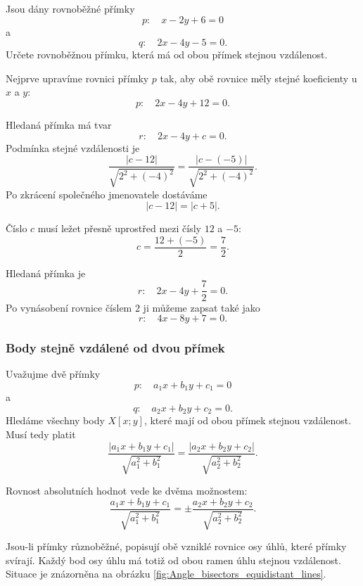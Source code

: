 \begin{example}\label{exa:Midline_parallel_strip}
    Jsou dány rovnoběžné přímky
    \[
        p:\quad x-2y+6=0
    \]
    a
    \[
        q:\quad 2x-4y-5=0.
    \]
    Určete rovnoběžnou přímku, která má od obou přímek stejnou
    vzdálenost.

    Nejprve upravíme rovnici přímky $p$ tak, aby obě rovnice měly
    stejné koeficienty u $x$ a $y$:
    \[
        p:\quad 2x-4y+12=0.
    \]

    Hledaná přímka má tvar
    \[
        r:\quad 2x-4y+c=0.
    \]
    Podmínka stejné vzdálenosti je
    \[
        \frac{|c-12|}{\sqrt{2^2+(-4)^2}}
        =
        \frac{|c-(-5)|}{\sqrt{2^2+(-4)^2}}.
    \]
    Po zkrácení společného jmenovatele dostáváme
    \[
        |c-12|=|c+5|.
    \]

    Číslo $c$ musí ležet přesně uprostřed mezi čísly $12$ a $-5$:
    \[
        c
        =
        \frac{12+(-5)}{2}
        =
        \frac72.
    \]

    Hledaná přímka je
    \[
        r:\quad 2x-4y+\frac72=0.
    \]
    Po vynásobení rovnice číslem $2$ ji můžeme zapsat také jako
    \[
        r:\quad 4x-8y+7=0.
    \]
\end{example}


\subsubsection{Body stejně vzdálené od dvou přímek}
\label{subsubsec:Points_equidistant_two_lines}

Uvažujme dvě přímky
\[
    p:\quad a_1x+b_1y+c_1=0
\]
a
\[
    q:\quad a_2x+b_2y+c_2=0.
\]
Hledáme všechny body $X[x;y]$, které mají od obou přímek stejnou
vzdálenost. Musí tedy platit
\begin{equation}\label{eq:Equidistant_two_lines_absolute}
    \frac{|a_1x+b_1y+c_1|}{\sqrt{a_1^2+b_1^2}}
    =
    \frac{|a_2x+b_2y+c_2|}{\sqrt{a_2^2+b_2^2}}.
\end{equation}

Rovnost absolutních hodnot vede ke dvěma možnostem:
\begin{equation}\label{eq:Angle_bisectors_general}
    \frac{a_1x+b_1y+c_1}{\sqrt{a_1^2+b_1^2}}
    =
    \pm
    \frac{a_2x+b_2y+c_2}{\sqrt{a_2^2+b_2^2}}.
\end{equation}

Jsou-li přímky různoběžné, popisují obě vzniklé rovnice osy úhlů,
které přímky svírají. Každý bod osy úhlu má totiž od obou ramen úhlu
stejnou vzdálenost. Situace je znázorněna na obrázku
\ref{fig:Angle_bisectors_equidistant_lines}.

